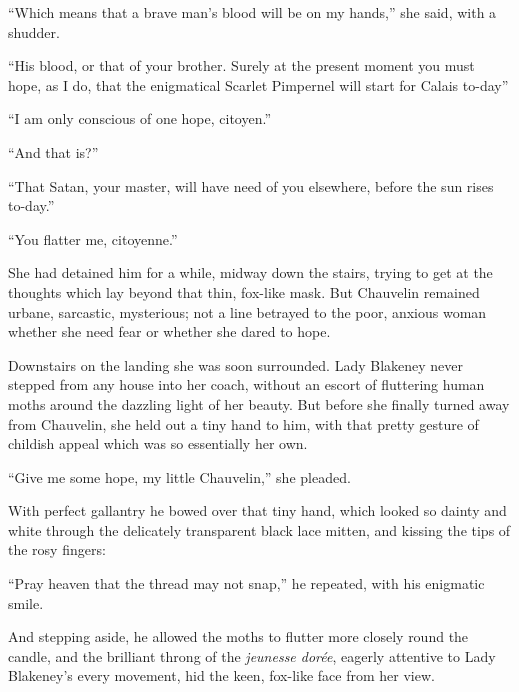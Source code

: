 \enquote{Which means that a brave man's blood will be on my hands,} she said, with a shudder.

\enquote{His blood, or that of your brother. Surely at the present moment you must hope, as I do, that the enigmatical Scarlet Pimpernel will start for Calais to-day\longdash}

\enquote{I am only conscious of one hope, citoyen.}

\enquote{And that is?}

\enquote{That Satan, your master, will have need of you elsewhere, before the sun rises to-day.}

\enquote{You flatter me, citoyenne.}

She had detained him for a while, midway down the stairs, trying to get at the thoughts which lay beyond that thin, fox-like mask. But Chauvelin remained urbane, sarcastic, mysterious; not a line betrayed to the poor, anxious woman whether she need fear or whether she dared to hope.

Downstairs on the landing she was soon surrounded. Lady Blakeney never stepped from any house into her coach, without an escort of fluttering human moths around the dazzling light of her beauty. But before she finally turned away from Chauvelin, she held out a tiny hand to him, with that pretty gesture of childish appeal which was so essentially her own.

\enquote{Give me some hope, my little Chauvelin,} she pleaded.

With perfect gallantry he bowed over that tiny hand, which looked so dainty and white through the delicately transparent black lace mitten, and kissing the tips of the rosy fingers:\longdash


\enquote{Pray heaven that the thread may not snap,} he repeated, with his enigmatic smile.

And stepping aside, he allowed the moths to flutter more closely round the candle, and the brilliant throng of the \textit{jeunesse dorée}, eagerly attentive to Lady Blakeney's every movement, hid the keen, fox-like face from her view.